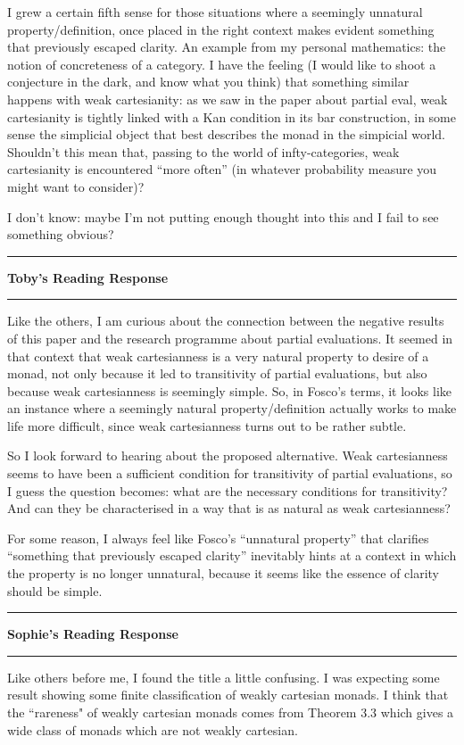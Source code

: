 \documentclass{amsart}
\newcommand{\iam}[1]{
  \vspace{0.25em}
  \hrule
  \vspace{0.25em}
  \textbf{{#1}'s Reading Response}
  \vspace{0.25em}
  \hrule
  \vspace{1em}
}
\begin{document}
I grew a certain fifth sense for those situations where a seemingly unnatural property/definition, once placed in the right context makes evident something that previously escaped clarity. An example from my personal mathematics: the notion of concreteness of a category. I have the feeling (I would like to shoot a conjecture in the dark, and know what you think) that something similar happens with weak cartesianity: as we saw in the paper about partial eval, weak cartesianity is tightly linked with a Kan condition in its bar construction, in some sense the simplicial object that best describes the monad in the simpicial world. Shouldn't this mean that, passing to the world of infty-categories, weak cartesianity is encountered ``more often'' (in whatever probability measure you might want to consider)?

I don't know: maybe I'm not putting enough thought into this and I fail to see something obvious?


\iam{Toby}

Like the others, I am curious about the connection between the negative results
of this paper and the research programme about partial evaluations. It seemed in
that context that weak cartesianness is a very natural property to desire of a
monad, not only because it led to transitivity of partial evaluations, but also
because weak cartesianness is seemingly simple. So, in Fosco's terms, it looks
like an instance where a seemingly natural property/definition actually works to
make life more difficult, since weak cartesianness turns out to be rather
subtle.

So I look forward to hearing about the proposed alternative. Weak cartesianness
seems to have been a sufficient condition for transitivity of partial
evaluations, so I guess the question becomes: what are the necessary conditions
for transitivity? And can they be characterised in a way that is as natural as
weak cartesianness?

For some reason, I always feel like Fosco's ``unnatural property'' that
clarifies ``something that previously escaped clarity'' inevitably hints at a
context in which the property is no longer unnatural, because it seems like the
essence of clarity should be simple.


\iam{Sophie}

Like others before me, I found the title a little confusing. I was expecting some result showing some finite classification of weakly cartesian monads. I think that the ``rareness" of weakly cartesian monads comes from Theorem 3.3 which gives a wide class of monads which are not weakly cartesian.
\end{document}
